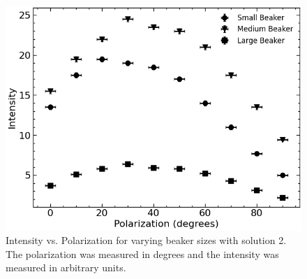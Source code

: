 \begin{figure}[H]
    \begin{center}
        \includegraphics[width=\columnwidth]{../figures/solution2.png}
    \end{center}
    \caption{Intensity vs. Polarization for varying beaker sizes with solution 2. The polarization was measured in degrees and the intensity was measured in arbitrary units.}
    \label{fig:solution2}
\end{figure}

